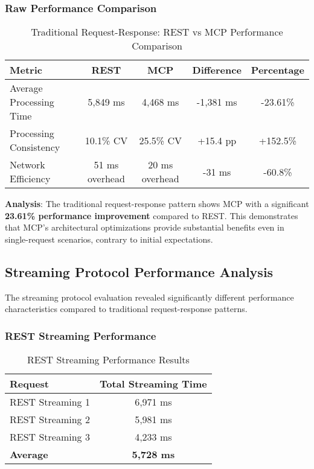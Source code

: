 \subsubsection{Raw Performance Comparison}

\begin{table}[h]
\centering
\caption{Traditional Request-Response: REST vs MCP Performance Comparison}
\begin{tabular}{|l|c|c|c|c|}
\hline
\textbf{Metric} & \textbf{REST} & \textbf{MCP} & \textbf{Difference} & \textbf{Percentage} \\
\hline
Average Processing Time & 5,849 ms & 4,468 ms & -1,381 ms & -23.61\% \\
\hline
Processing Consistency & 10.1\% CV & 25.5\% CV & +15.4 pp & +152.5\% \\
\hline
Network Efficiency & 51 ms overhead & 20 ms overhead & -31 ms & -60.8\% \\
\hline
\end{tabular}
\end{table}

\textbf{Analysis}: The traditional request-response pattern shows MCP with a significant \textbf{23.61\% performance improvement} compared to REST. This demonstrates that MCP's architectural optimizations provide substantial benefits even in single-request scenarios, contrary to initial expectations.

\subsection{Streaming Protocol Performance Analysis}

The streaming protocol evaluation revealed significantly different performance characteristics compared to traditional request-response patterns.

\subsubsection{REST Streaming Performance}

\begin{table}[h]
\centering
\caption{REST Streaming Performance Results}
\begin{tabular}{|l|c|}
\hline
\textbf{Request} & \textbf{Total Streaming Time} \\
\hline
REST Streaming 1 & 6,971 ms \\
\hline
REST Streaming 2 & 5,981 ms \\
\hline
REST Streaming 3 & 4,233 ms \\
\hline
\textbf{Average} & \textbf{5,728 ms} \\
\hline
\end{tabular}
\end{table}

